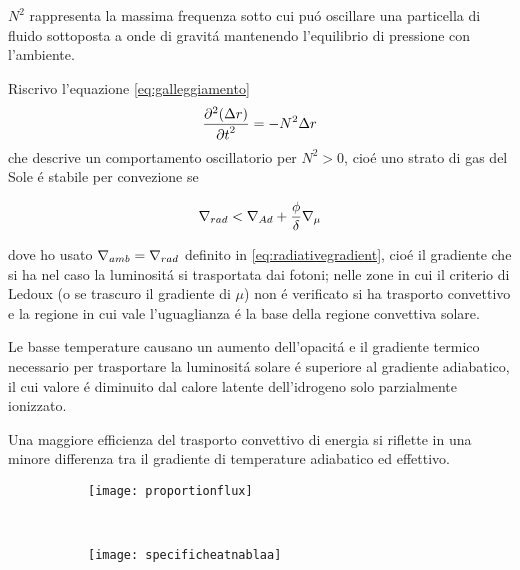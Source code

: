 \documentclass[../main.tex]{subfiles}
\begin{document}
$N^2$ rappresenta la massima frequenza sotto cui pu\'o oscillare una particella di fluido sottoposta a onde di gravit\'a mantenendo l'equilibrio di pressione con l'ambiente.

Riscrivo l'equazione \eqref{eq:galleggiamento}
\begin{equation}
\PtwoDy{t}{(\Delta r)}=-N^2\Delta r
\end{equation}
che descrive un comportamento oscillatorio per $N^2>0$, cio\'e uno strato di gas del Sole \'e stabile per convezione se

\begin{equation}
\nrad{}<\nad+\frac{\phi}{\delta}\nmu{}\label{eq:ledoux}
\end{equation}

dove ho usato $\nabla_{amb}=\nrad{}$ definito in \eqref{eq:radiativegradient}, cio\'e il gradiente che si ha nel caso la luminosit\'a si trasportata dai fotoni; nelle zone in cui il criterio di Ledoux (o \sch{} se trascuro il gradiente di $\mu$) non \'e verificato si ha trasporto convettivo e la regione in cui vale l'uguaglianza \'e la base della regione convettiva solare.

Le basse temperature causano un aumento dell'opacit\'a e il gradiente termico necessario per trasportare la luminosit\'a solare \'e superiore al gradiente adiabatico, il cui valore \'e diminuito dal calore latente dell'idrogeno solo parzialmente ionizzato.

Una maggiore efficienza del trasporto convettivo di energia si riflette in una minore differenza tra il gradiente di temperature adiabatico ed effettivo.

\begin{figure}[!h]
\begin{subfigure}[l]{0.55\textwidth}
    \texttt{[image: proportionflux]}
    \label{fluxproportion}
\end{subfigure}
~
\begin{subfigure}[r]{0.4\textwidth}
\centering
\texttt{[image: specificheatnablaa]}
\end{subfigure}
    
\end{figure}
\end{document}
